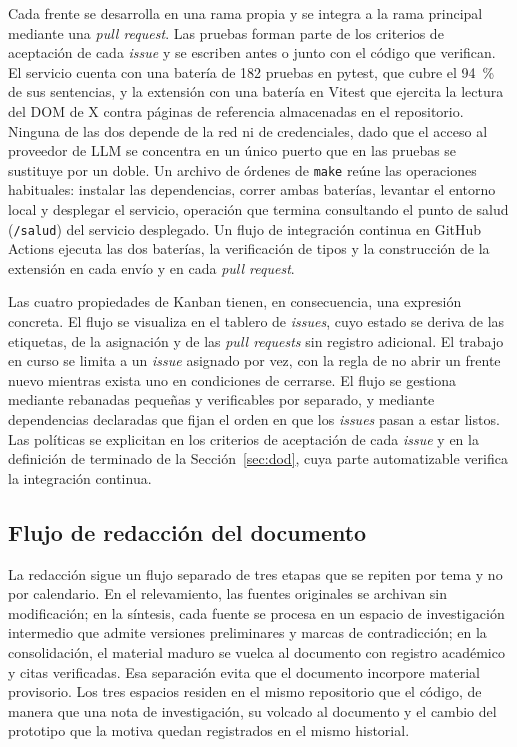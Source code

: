 Cada frente se desarrolla en una rama propia y se integra a la rama principal mediante una \textit{pull request}. Las pruebas forman parte de los criterios de aceptación de cada \textit{issue} y se escriben antes o junto con el código que verifican. El servicio cuenta con una batería de 182 pruebas en pytest, que cubre el 94~\% de sus sentencias, y la extensión con una batería en Vitest que ejercita la lectura del DOM de X contra páginas de referencia almacenadas en el repositorio. Ninguna de las dos depende de la red ni de credenciales, dado que el acceso al proveedor de LLM se concentra en un único puerto que en las pruebas se sustituye por un doble. Un archivo de órdenes de \texttt{make} reúne las operaciones habituales: instalar las dependencias, correr ambas baterías, levantar el entorno local y desplegar el servicio, operación que termina consultando el punto de salud (\texttt{/salud}) del servicio desplegado. Un flujo de integración continua en GitHub Actions ejecuta las dos baterías, la verificación de tipos y la construcción de la extensión en cada envío y en cada \textit{pull request}.

Las cuatro propiedades de Kanban tienen, en consecuencia, una expresión concreta. El flujo se visualiza en el tablero de \textit{issues}, cuyo estado se deriva de las etiquetas, de la asignación y de las \textit{pull requests} sin registro adicional. El trabajo en curso se limita a un \textit{issue} asignado por vez, con la regla de no abrir un frente nuevo mientras exista uno en condiciones de cerrarse. El flujo se gestiona mediante rebanadas pequeñas y verificables por separado, y mediante dependencias declaradas que fijan el orden en que los \textit{issues} pasan a estar listos. Las políticas se explicitan en los criterios de aceptación de cada \textit{issue} y en la definición de terminado de la Sección~\ref{sec:dod}, cuya parte automatizable verifica la integración continua.

\subsection{Flujo de redacción del documento}

La redacción sigue un flujo separado de tres etapas que se repiten por tema y no por calendario. En el relevamiento, las fuentes originales se archivan sin modificación; en la síntesis, cada fuente se procesa en un espacio de investigación intermedio que admite versiones preliminares y marcas de contradicción; en la consolidación, el material maduro se vuelca al documento con registro académico y citas verificadas. Esa separación evita que el documento incorpore material provisorio. Los tres espacios residen en el mismo repositorio que el código, de manera que una nota de investigación, su volcado al documento y el cambio del prototipo que la motiva quedan registrados en el mismo historial.

